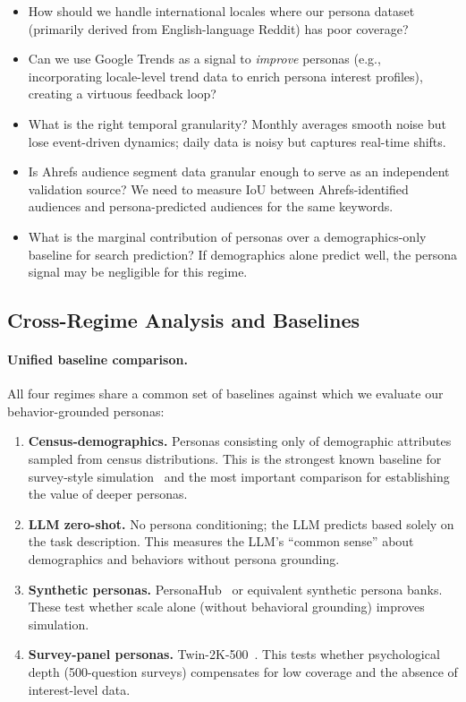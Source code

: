 \begin{itemize}
    \item How should we handle international locales where our persona dataset (primarily derived from English-language Reddit) has poor coverage?
    \item Can we use Google Trends as a signal to \emph{improve} personas (e.g., incorporating locale-level trend data to enrich persona interest profiles), creating a virtuous feedback loop?
    \item What is the right temporal granularity? Monthly averages smooth noise but lose event-driven dynamics; daily data is noisy but captures real-time shifts.
    \item Is Ahrefs audience segment data granular enough to serve as an independent validation source? We need to measure IoU between Ahrefs-identified audiences and persona-predicted audiences for the same keywords.
    \item What is the marginal contribution of personas over a demographics-only baseline for search prediction? If demographics alone predict well, the persona signal may be negligible for this regime.
\end{itemize}


\subsection{Cross-Regime Analysis and Baselines}
\label{sec:eval-crossregime}

\paragraph{Unified baseline comparison.}
All four regimes share a common set of baselines against which we evaluate our behavior-grounded personas:
\begin{enumerate}
    \item \textbf{Census-demographics.} Personas consisting only of demographic attributes sampled from census distributions. This is the strongest known baseline for survey-style simulation~\cite{argyle2023out} and the most important comparison for establishing the value of deeper personas.
    \item \textbf{LLM zero-shot.} No persona conditioning; the LLM predicts based solely on the task description. This measures the LLM's ``common sense'' about demographics and behaviors without persona grounding.
    \item \textbf{Synthetic personas.} PersonaHub~\cite{personahub} or equivalent synthetic persona banks. These test whether scale alone (without behavioral grounding) improves simulation.
    \item \textbf{Survey-panel personas.} Twin-2K-500~\cite{twin2k500}. This tests whether psychological depth (500-question surveys) compensates for low coverage and the absence of interest-level data.
\end{enumerate}

